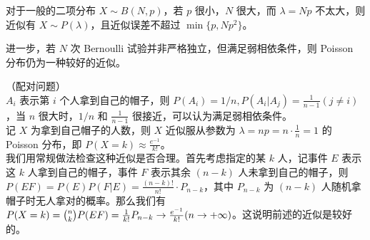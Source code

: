 \documentclass[../main.tex]{subfiles}
\begin{document}
对于一般的二项分布 $X\sim B(N,p)$，若 $p$ 很小，$N$ 很大，而 $\lambda=Np$ 不太大，则近似有 $X\sim P(\lambda)$，且近似误差不超过 $\min\{p,Np^2\}$。

进一步，若 $N$ 次 Bernoulli 试验并非严格独立，但满足弱相依条件，则 Poisson 分布仍为一种较好的近似。

\begin{example}
（配对问题）\\
$A_i$ 表示第 $i$ 个人拿到自己的帽子，则 $P(A_i)=1/n,P(A_i|A_j)=\frac{1}{n-1}(j\neq i)$，当 $n$ 很大时，$1/n$ 和 $\frac{1}{n-1}$ 很接近，可以认为满足弱相依条件。\\
记 $X$ 为拿到自己帽子的人数，则 $X$ 近似服从参数为 $\lambda=np=n\cdot\frac{1}{n}=1$ 的 Poisson 分布，即 $P(X=k)\approx\frac{e^{-1}}{k!}$。\\
我们用常规做法检查这种近似是否合理。首先考虑指定的某 $k$ 人，记事件 $E$ 表示这 $k$ 人拿到自己的帽子，事件 $F$ 表示其余 $(n-k)$ 人未拿到自己的帽子，则 $P(EF)=P(E)P(F|E)=\frac{(n-k)!}{n!}\cdot P_{n-k}$，其中 $P_{n-k}$ 为 $(n-k)$ 人随机拿帽子时无人拿对的概率。那么我们有 $P(X=k)=\tbinom{n}{k}P(EF)=\frac{1}{k!}P_{n-k}\rightarrow\frac{e^{-1}}{k!}(n\rightarrow+\infty)$。这说明前述的近似是较好的。
\end{example}
\end{document}
